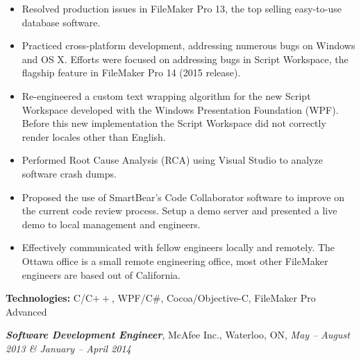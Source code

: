 \documentclass[10pt,letterpaper]{article}
\newcommand{\job}[4]
{
    \emph{\textbf{#1}}, #2, #3, \emph{#4}
}
\begin{document}
\begin{adjustwidth}{0.1in}{0.5in}
    \begin{itemize}
    \item Resolved production issues in FileMaker Pro 13, the top selling easy-to-use database software.
    \item Practiced cross-platform development, addressing numerous bugs on Windows and OS X. Efforts were focused on addressing bugs in Script Workspace, the flagship feature in FileMaker Pro 14 (2015 release).
    \item Re-engineered a custom text wrapping algorithm for the new Script Workspace developed with the Windows Presentation Foundation (WPF). Before this new implementation the Script Workspace did not correctly render locales other than English.
    \item Performed Root Cause Analysis (RCA) using Visual Studio to analyze software crash dumps.
    \item Proposed the use of SmartBear's Code Collaborator software to improve on the current code review process. Setup a demo server and presented a live demo to local management and engineers.
    \item Effectively communicated with fellow engineers locally and remotely. The Ottawa office is a small remote engineering office, most other FileMaker engineers are based out of California.
    \end{itemize}
    \vspace{0.5em}
    \textbf{Technologies:} C/C$++$, WPF/C\#, Cocoa/Objective-C, FileMaker Pro Advanced
\end{adjustwidth}
\vspace{0.8em}
\job{Software Development Engineer}{McAfee Inc.}{Waterloo, ON}{ May -- August 2013 \& January -- April 2014 }\\
\end{document}
